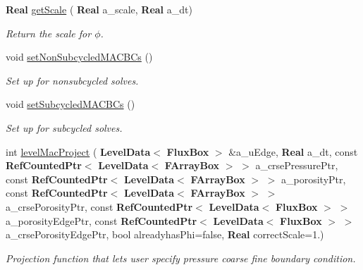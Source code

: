 \begin{DoxyCompactItemize}
\mbox{\label{class_projector_acefbf42b8eeba92e70773f49a59b138f}} 
\textbf{ Real} \hyperlink{class_projector_acefbf42b8eeba92e70773f49a59b138f}{get\+Scale} (\textbf{ Real} a\+\_\+scale, \textbf{ Real} a\+\_\+dt)
\begin{DoxyCompactList}\small\item\em Return the scale for $ \phi $. \end{DoxyCompactList}\item 
\mbox{\label{class_projector_a04cd23cb859525e30ae28aa4b8c0de22}} 
void \hyperlink{class_projector_a04cd23cb859525e30ae28aa4b8c0de22}{set\+Non\+Subcycled\+M\+A\+C\+B\+Cs} ()
\begin{DoxyCompactList}\small\item\em Set up for nonsubcycled solves. \end{DoxyCompactList}\item 
\mbox{\label{class_projector_a9ce7020803aef876be472bff56871019}} 
void \hyperlink{class_projector_a9ce7020803aef876be472bff56871019}{set\+Subcycled\+M\+A\+C\+B\+Cs} ()
\begin{DoxyCompactList}\small\item\em Set up for subcycled solves. \end{DoxyCompactList}\item 
\mbox{\label{class_projector_a0879082fa81c4a63cfc018b0fdd55d91}} 
int \hyperlink{class_projector_a0879082fa81c4a63cfc018b0fdd55d91}{level\+Mac\+Project} (\textbf{ Level\+Data}$<$ \textbf{ Flux\+Box} $>$ \&a\+\_\+u\+Edge, \textbf{ Real} a\+\_\+dt, const \textbf{ Ref\+Counted\+Ptr}$<$ \textbf{ Level\+Data}$<$ \textbf{ F\+Array\+Box} $>$ $>$ a\+\_\+crse\+Pressure\+Ptr, const \textbf{ Ref\+Counted\+Ptr}$<$ \textbf{ Level\+Data}$<$ \textbf{ F\+Array\+Box} $>$ $>$ a\+\_\+porosity\+Ptr, const \textbf{ Ref\+Counted\+Ptr}$<$ \textbf{ Level\+Data}$<$ \textbf{ F\+Array\+Box} $>$ $>$ a\+\_\+crse\+Porosity\+Ptr, const \textbf{ Ref\+Counted\+Ptr}$<$ \textbf{ Level\+Data}$<$ \textbf{ Flux\+Box} $>$ $>$ a\+\_\+porosity\+Edge\+Ptr, const \textbf{ Ref\+Counted\+Ptr}$<$ \textbf{ Level\+Data}$<$ \textbf{ Flux\+Box} $>$ $>$ a\+\_\+crse\+Porosity\+Edge\+Ptr, bool alreadyhas\+Phi=false, \textbf{ Real} correct\+Scale=1.)
\begin{DoxyCompactList}\small\item\em Projection function that let\textquotesingle{}s user specify pressure coarse fine boundary condition. \end{DoxyCompactList}\item 

\end{DoxyCompactItemize}
